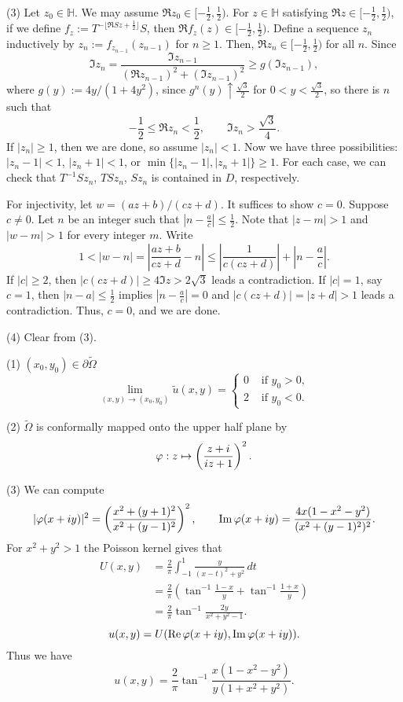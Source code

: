 \documentclass{../../../small}
\renewcommand{\H}{\mathbb{H}}
\begin{document}
\begin{pf}[Solution of 1]

(3)
Let $z_0\in\H$.
We may assume $\Re z_0\in[-\frac12,\frac12)$.
For $z\in\H$ satisfying $\Re z\in[-\frac12,\frac12)$, if we define $f_z:=T^{-\lfloor\Re Sz+\frac12\rfloor}S$, then $\Re f_z(z)\in[-\frac12,\frac12)$.
Define a sequence $z_n$ inductively by $z_n:=f_{z_{n-1}}(z_{n-1})$ for $n\ge1$.
Then, $\Re z_n\in[-\frac12,\frac12)$ for all $n$.
Since
\[\Im z_n=\frac{\Im z_{n-1}}{(\Re z_{n-1})^2+(\Im z_{n-1})^2}\ge g(\Im z_{n-1}),\]
where $g(y):=4y/(1+4y^2)$, since $g^n(y)\uparrow\frac{\sqrt3}2$ for $0<y<\frac{\sqrt3}2$, so there is $n$ such that
\[-\frac12\le\Re z_n<\frac12,\qquad\Im z_n>\frac{\sqrt3}4.\]
If $|z_n|\ge1$, then we are done, so assume $|z_n|<1$.
Now we have three possibilities: $|z_n-1|<1$, $|z_n+1|<1$, or $\min\{|z_n-1|,|z_n+1|\}\ge1$.
For each case, we can check that $T^{-1}Sz_n$, $TSz_n$, $Sz_n$ is contained in $D$, respectively.

For injectivity, let $w=(az+b)/(cz+d)$.
It suffices to show $c=0$.
Suppose $c\ne0$.
Let $n$ be an integer such that $|n-\frac ac|\le\frac12$.
Note that $|z-m|>1$ and $|w-m|>1$ for every integer $m$.
Write
\[1<|w-n|=\left|\frac{az+b}{cz+d}-n\right|\le\left|\frac1{c(cz+d)}\right|+\left|n-\frac ac\right|.\]
If $|c|\ge2$, then $|c(cz+d)|\ge4\Im z>2\sqrt3$
leads a contradiction.
If $|c|=1$, say $c=1$, then $|n-a|\le\frac12$ implies $|n-\frac ac|=0$ and $|c(cz+d)|=|z+d|>1$ leads a contradiction.
Thus, $c=0$, and we are done.

(4)
Clear from (3).
\end{pf}

\begin{pf}[Solution of 5]
(1)
$(x_0,y_0)\in\partial\tilde\Omega$
\[\lim_{(x,y)\to(x_0,y_0)}\tilde u(x,y)=\begin{cases}
0&\text{ if }y_0>0,\\
2&\text{ if }y_0<0.
\end{cases}\]

(2)
$\tilde\Omega$ is conformally mapped onto the upper half plane by
\[\varphi:z\mapsto\left(\frac{z+i}{iz+1}\right)^2.\]

(3)
We can compute
\[|\varphi(x+iy)|^2=\left(\frac{x^2+(y+1)^2}{x^2+(y-1)^2}\right)^2,\qquad\operatorname{Im}\varphi(x+iy)=\frac{4x(1-x^2-y^2)}{(x^2+(y-1)^2)^2}.\]
For $x^2+y^2>1$ the Poisson kernel gives that
\begin{align*}
U(x,y)
&=\frac2\pi\int_{-1}^1\frac y{(x-t)^2+y^2}\,dt\\
&=\frac2\pi\left(\tan^{-1}\frac{1-x}y+\tan^{-1}\frac{1+x}y\right)\\
&=\frac2\pi\tan^{-1}\frac{2y}{x^2+y^2-1}.
\end{align*}
\[u(x,y)=U(\operatorname{Re}\varphi(x+iy),\operatorname{Im}\varphi(x+iy)).\]
Thus we have
\[u(x,y)=\frac2\pi\tan^{-1}\frac{x(1-x^2-y^2)}{y(1+x^2+y^2)}.\]
\end{pf}
\end{document}
